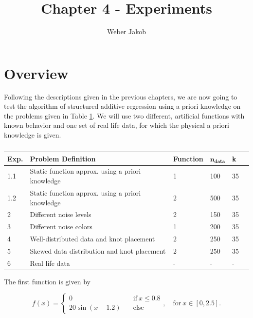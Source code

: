 \documentclass[10pt,a4paper]{article}
\title{Chapter 4 - Experiments}
\author{Weber Jakob}
\begin{document}
	\maketitle
	
\tableofcontents

\section{Overview}

Following the descriptions given in the previous chapters, we are now going to test the algorithm of structured additive regression using a priori knowledge on the problems given in Table \ref{tab:experiments}. We will use two different, artificial functions with known behavior and one set of real life data, for which the physical a priori knowledge is given. 

\begin{table}[h]
	\begin{tabular}{|l|l|l|l|l|l|}
		\hline
		\textbf{Exp.} & \textbf{Problem Definition} & \textbf{Function} & \textbf{$\boldsymbol{n_{data}}$} & \textbf{k}  \\ \hline
		1.1 & Static function approx. using a priori knowledge & 1 & 100 & 35  \\ \hline
		1.2 & Static function approx. using a priori knowledge & 2 & 500 & 35  \\ \hline
		2   & Different noise levels                                 & 2 & 150 & 35  \\ \hline
		3   & Different noise colors                                 & 1 & 200 & 35  \\ \hline
		4   & Well-distributed data and knot placement               & 2 & 250 & 35  \\ \hline
		5   & Skewed data distribution and knot placement            & 2 & 250 & 35  \\ \hline
		6   & Real life data                                         & - & -   & -   \\ \hline
	\end{tabular}
	\caption{}
	\label{tab:experiments}
\end{table}

The first function is given by

\begin{equation} \label{eq:test_func_1}
	f(x) = \begin{cases}
			 0 \quad &\text{if} \ x \le 0.8 \\ 
			 20\sin (x-1.2) \quad &\text{else}  
		  \end{cases}, \quad \text{for} \ x \in [0, 2.5].
\end{equation}
	
\end{document}
